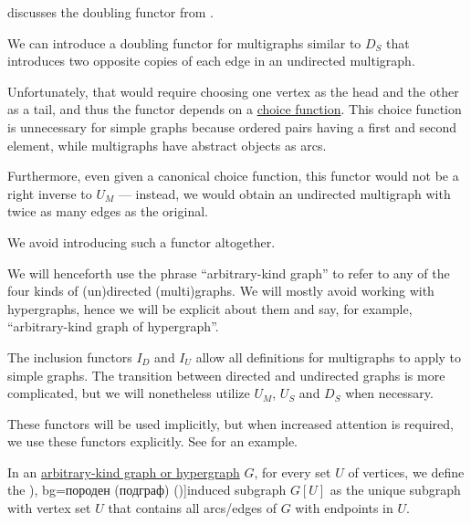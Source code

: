 \begin{comments}
  \item {} discusses the doubling functor from .
  \item We can introduce a doubling functor for multigraphs similar to \hyperref[def:graph_functors/simple_doubling]{\( D_S \)} that introduces two opposite copies of each edge in an undirected multigraph.

  Unfortunately, that would require choosing one vertex as the head and the other as a tail, and thus the functor depends on a \hyperref[def:choice_function]{choice function}. This choice function is unnecessary for simple graphs because ordered pairs having a first and second element, while multigraphs have abstract objects as arcs.

  Furthermore, even given a canonical choice function, this functor would not be a right inverse to \hyperref[def:graph_functors/multi_forgetful]{\( U_M \)} --- instead, we would obtain an undirected multigraph with twice as many edges as the original.

  We avoid introducing such a functor altogether.
\end{comments}

\begin{remark}\label{rem:arbitrary_kind_graph}
  We will henceforth use the phrase \enquote{arbitrary-kind graph} to refer to any of the four kinds of (un)directed (multi)graphs. We will mostly avoid working with hypergraphs, hence we will be explicit about them and say, for example, \enquote{arbitrary-kind graph of hypergraph}.

  The inclusion functors \hyperref[def:graph_functors/directed_inclusion]{\( I_D \)} and \hyperref[def:graph_functors/undirected_inclusion]{\( I_U \)} allow all definitions for multigraphs to apply to simple graphs. The transition between directed and undirected graphs is more complicated, but we will nonetheless utilize \hyperref[def:graph_functors/multi_forgetful]{\( U_M \)}, \hyperref[def:graph_functors/simple_forgetful]{\( U_S \)} and \hyperref[def:graph_functors/simple_doubling]{\( D_S \)} when necessary.

  These functors will be used implicitly, but when increased attention is required, we use these functors explicitly. See  for an example.
\end{remark}

\begin{definition}\label{def:induced_subgraph}
  In an \hyperref[rem:arbitrary_kind_graph]{arbitrary-kind graph or hypergraph} \( G \), for every set \( U \) of vertices, we define the \term[ru=порождённый (подграф) (\cite[17]{Емеличев1990Графы}), bg=породен (подграф) (\cite[18]{Мирчев2001Графи})]{induced subgraph} \( G[U] \) as the unique subgraph with vertex set \( U \) that contains all arcs/edges of \( G \) with endpoints in \( U \).
\end{definition}

